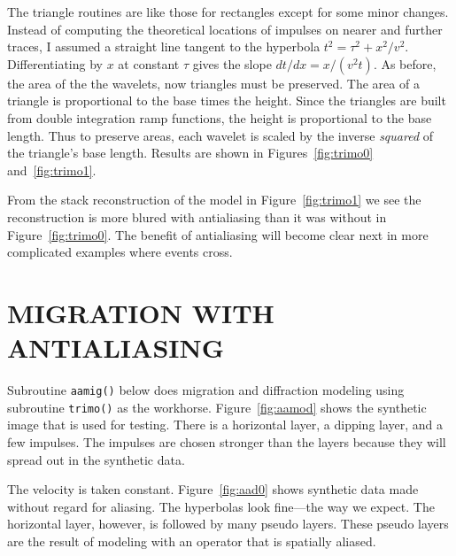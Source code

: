 The triangle routines are like those for rectangles
except for some minor changes.
Instead of computing the theoretical locations
of impulses on nearer and further traces,
I assumed a straight line tangent to the hyperbola
$t^2 = \tau^2+x^2/v^2$.
Differentiating by $x$ at constant $\tau$ gives the slope
$dt/dx= x/(v^2t)$.
As before, the area of the the wavelets, now triangles must be preserved.
The area of a triangle is proportional to the base times the height.
Since the triangles are built from double integration ramp functions,
the height is proportional to the base length.
Thus to preserve areas, each wavelet is scaled by the inverse {\em  squared}
of the triangle's base length.
Results are shown in
Figures~\ref{fig:trimo0} and~\ref{fig:trimo1}.

\begin{comment}
\progdex{tristack}{stack with triangle footprint} 

\progdex{trimo}{triangle footprint}
\end{comment}

From the stack reconstruction of the model in Figure~\ref{fig:trimo1}
we see the reconstruction is more blured with antialiasing
than it was without in Figure~\ref{fig:trimo0}.
The benefit of antialiasing will become clear next
in more complicated examples where events cross.

\section{MIGRATION WITH ANTIALIASING}
Subroutine {\tt aamig()} below does migration and diffraction modeling
using subroutine {\tt trimo()} as the workhorse. %
Figure~\ref{fig:aamod} shows the synthetic image
that is used for testing.
There is a horizontal layer, a dipping layer, and a few impulses.
The impulses are chosen stronger than the layers because
they will spread out in the synthetic data.

The velocity is taken constant.
Figure~\ref{fig:aad0} shows synthetic data made without regard for aliasing.
The hyperbolas look fine---the way we expect.
The horizontal layer, however, is followed by many pseudo layers.
These pseudo layers are the result of modeling with an operator
that is spatially aliased.

